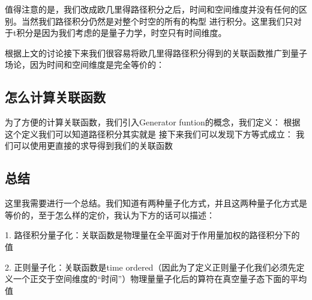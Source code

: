 值得注意的是，我们改成欧几里得路径积分之后，时间和空间维度并没有任何的区别。当然我们路径积分仍然是对整个时空的所有的构型
进行积分。这里我们只对于t积分是因为我们考虑的是量子力学，时空只有时间维度。

\line
根据上文的讨论接下来我们很容易将欧几里得路径积分得到的关联函数推广到量子场论，因为时间和空间维度是完全等价的：







\subsection{怎么计算关联函数}
为了方便的计算关联函数，我们引入Generator funtion的概念，我们定义：
根据这个定义我们可以知道路径积分其实就是
接下来我们可以发现下方等式成立：
我们可以使用更直接的求导得到我们的关联函数

\subsection{总结}
这里我需要进行一个总结。我们知道有两种量子化方式，并且这两种量子化方式是等价的，至于怎么样的定价，我认为下方的话可以描述：

1. 路径积分量子化：关联函数是物理量在全平面对于作用量加权的路径积分下的值

2. 正则量子化：关联函数是time ordered（因此为了定义正则量子化我们必须先定义一个正交于空间维度的“时间”）物理量量子化后的算符在真空量子态下面的平均值

